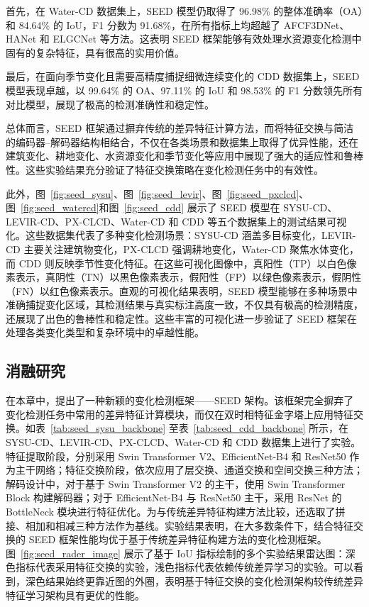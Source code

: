 首先，在 Water-CD 数据集上，SEED 模型仍取得了 96.98\% 的整体准确率（OA）和 84.64\% 的 IoU，F1 分数为 91.68\%，在所有指标上均超越了 AFCF3DNet、HANet 和 ELGCNet 等方法。这表明 SEED 框架能够有效处理水资源变化检测中固有的复杂特征，具有很高的实用价值。

最后，在面向季节变化且需要高精度捕捉细微连续变化的 CDD 数据集上，SEED 模型表现卓越，以 99.64\% 的 OA、97.11\% 的 IoU 和 98.53\% 的 F1 分数领先所有对比模型，展现了极高的检测准确性和稳定性。

总体而言，SEED 框架通过摒弃传统的差异特征计算方法，而将特征交换与简洁的编码器–解码器结构相结合，不仅在各类场景和数据集上取得了优异性能，还在建筑变化、耕地变化、水资源变化和季节变化等应用中展现了强大的适应性和鲁棒性。这些实验结果充分验证了特征交换策略在变化检测任务中的有效性。

此外，图~\ref{fig:seed_sysu}、图~\ref{fig:seed_levir}、图~\ref{fig:seed_pxclcd}、图~\ref{fig:seed_watercd}和图~\ref{fig:seed_cdd} 展示了 SEED 模型在 SYSU-CD、LEVIR-CD、PX-CLCD、Water-CD 和 CDD 等五个数据集上的测试结果可视化。这些数据集代表了多种变化检测场景：SYSU-CD 涵盖多目标变化，LEVIR-CD 主要关注建筑物变化，PX-CLCD 强调耕地变化，Water-CD 聚焦水体变化，而 CDD 则反映季节性变化特征。在这些可视化图像中，真阳性（TP）以白色像素表示，真阴性（TN）以黑色像素表示，假阳性（FP）以绿色像素表示，假阴性（FN）以红色像素表示。直观的可视化结果表明，SEED 模型能够在多种场景中准确捕捉变化区域，其检测结果与真实标注高度一致，不仅具有极高的检测精度，还展现了出色的鲁棒性和稳定性。这些丰富的可视化进一步验证了 SEED 框架在处理各类变化类型和复杂环境中的卓越性能。

\subsection{消融研究}
在本章中，提出了一种新颖的变化检测框架——SEED 架构。该框架完全摒弃了变化检测任务中常用的差异特征计算模块，而仅在双时相特征金字塔上应用特征交换。如表~\ref{tab:seed_sysu_backbone} 至表~\ref{tab:seed_cdd_backbone} 所示，在 SYSU-CD、LEVIR-CD、PX-CLCD、Water-CD 和 CDD 数据集上进行了实验。特征提取阶段，分别采用 Swin Transformer V2、EfficientNet-B4 和 ResNet50 作为主干网络；特征交换阶段，依次应用了层交换、通道交换和空间交换三种方法；解码设计中，对于基于 Swin Transformer V2 的主干，使用 Swin Transformer Block 构建解码器；对于 EfficientNet-B4 与 ResNet50 主干，采用 ResNet 的 BottleNeck 模块进行特征优化。为与传统差异特征构建方法比较，还选取了拼接、相加和相减三种方法作为基线。实验结果表明，在大多数条件下，结合特征交换的 SEED 框架性能均优于基于传统差异特征构建方法的变化检测框架。图~\ref{fig:seed_rader_image} 展示了基于 IoU 指标绘制的多个实验结果雷达图：深色指标代表采用特征交换的实验，浅色指标代表依赖传统差异学习的实验。可以看到，深色结果始终更靠近图的外圈，表明基于特征交换的变化检测架构较传统差异特征学习架构具有更优的性能。

